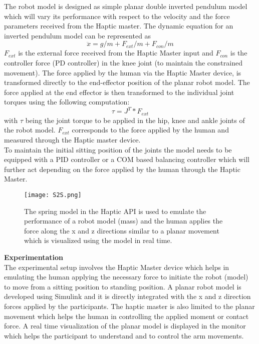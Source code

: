 The robot model is designed as simple planar double inverted pendulum model which will vary its performance with respect to the velocity and the force parameters received from the Haptic master. The dynamic equation for an inverted pendulum model can be represented as  
\begin {equation}
\ddot{x}= g/m+F_{ext}/m+F_{con}/m
\end{equation}
$ F_{ext}$ is the external force received from the Haptic Master input and $F_{con}$ is the controller force (PD controller) in the knee joint (to maintain the constrained movement). The force applied by the human via the Haptic Master device, is transformed directly to the end-effector position of the planar robot model. The force applied at the end effector is then transformed to the individual joint torques using the following computation:
\begin{equation}
\tau=J^{T}*F_{ext}
\end{equation}
with $\tau$ being the joint torque to be applied in the hip, knee and ankle joints of the robot model. $F_{ext}$ corresponds to the force applied by the human and measured through the Haptic master device.\\
To maintain the initial sitting position of the joints the model needs to be equipped with a PID controller or a COM based balancing controller which will further act depending on the force applied by the human through the Haptic Master.  
\begin{figure}[h!]
\centering
\texttt{[image: S2S.png]}
\caption{ The spring model in the Haptic API is used to emulate the performance of a robot model (mass) and the human applies the force along the x and z directions similar to a planar movement which is visualized using the model in real time.}
\label{Humanarmimpedance}
\end{figure}


\textbf{Experimentation}\\
The experimental setup involves the Haptic Master device which helps in emulating the human applying the necessary force to initiate the robot (model) to move from a sitting position to standing position. A planar robot model is developed using Simulink and it is directly integrated with the x and z direction forces applied by the participants. The haptic master is also limited to the planar movement which helps the human in controlling the applied moment or contact force. A real time visualization of the planar model is displayed in the monitor which helps the participant to understand and to control the arm movements.  

